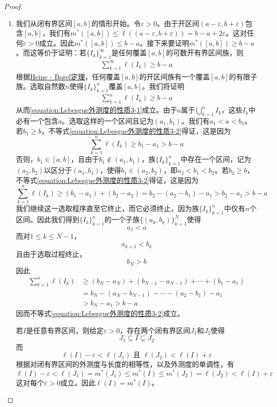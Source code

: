 \documentclass[lang=cn,newtx,10pt,scheme=chinese]{../Template/elegantbook}
\begin{document}
\begin{proof}
\begin{enumerate}[(1)]
  \item 我们从闭有界区间\([a, b]\)的情形开始。令\(\varepsilon>0\)。由于开区间\((a - \varepsilon, b+\varepsilon)\)包含\([a, b]\)，我们有\(m^*([a, b])\leqslant\ell((a - \varepsilon, b+\varepsilon))=b - a + 2\varepsilon\)。这对任何\(\varepsilon>0\)成立。因此\(m^*([a, b])\leqslant b - a\)。接下来要证明\(m^*([a, b])\geqslant b - a\)。而这等价于证明：若\(\{I_k\}_{k = 1}^{\infty}\)是任何覆盖\([a, b]\)的可数开有界区间族，则
  \begin{align}
    \sum_{k = 1}^{\infty}\ell(I_k)\geqslant b - a \label{equation:Lebesgue外测度的性质3-1}
  \end{align}
  根据\hyperref[theorem:Heine - Borel定理]{Heine - Borel定理}，任何覆盖\([a, b]\)的开区间族有一个覆盖\([a, b]\)的有限子族。选取自然数\(n\)使得\(\{I_k\}_{k = 1}^{n}\)覆盖\([a, b]\)。我们将证明
  \begin{align}
    \sum_{k = 1}^{n}\ell(I_k)\geqslant b - a \label{equation:Lebesgue外测度的性质3-2}
  \end{align}
  从而\eqref{equation:Lebesgue外测度的性质3-1}成立。由于\(a\)属于\(\bigcup_{k = 1}^{n}I_k\)，这些\(I_k\)中必有一个包含\(a\)。选取这样的一个区间且记为\((a_1, b_1)\)。我们有\(a_1 < a < b_1\)。若\(b_1\geqslant b\)，不等式\eqref{equation:Lebesgue外测度的性质3-2}得证，这是因为
  \[
  \sum_{k = 1}^{n}\ell(I_k)\geqslant b_1 - a_1>b - a
  \]
  否则，\(b_1\in[a, b]\)，且由于\(b_1\notin(a_1, b_1)\)，族\(\{I_k\}_{k = 1}^{n}\)中存在一个区间，记为\((a_2, b_2)\)以区分于\((a_1, b_1)\)，使得\(b_1\in(a_2, b_2)\)，即\(a_2 < b_1 < b_2\)。若\(b_2\geqslant b\)，不等式\eqref{equation:Lebesgue外测度的性质3-2}得证，这是因为
  \[
  \sum_{k = 1}^{n}\ell(I_k)\geqslant(b_1 - a_1)+(b_2 - a_2)=b_2-(a_2 - b_1)-a_1>b_2 - a_1>b - a
  \]
  我们继续这一选取程序直至它终止，而它必须终止，因为族\(\{I_k\}_{k = 1}^{n}\)中仅有\(n\)个区间。因此我们得到\(\{I_k\}_{k = 1}^{n}\)的一个子族\(\{(a_k, b_k)\}_{k = 1}^{N}\)使得
  \[
  a_1 < a
  \]
  而对\(1\leqslant k\leqslant N - 1\)，
  \[
  a_{k + 1} < b_k
  \]
  且由于选取过程终止，
  \[
  b_N>b
  \]
  因此
  \begin{align*}
  \sum_{k = 1}^{n}\ell(I_k)&\geqslant(b_N - a_N)+(b_{N - 1} - a_{N - 1})+\cdots+(b_1 - a_1)\\
  &=b_N-(a_N - b_{N - 1})-\cdots-(a_2 - b_1)-a_1\\
  &>b_N - a_1>b - a
  \end{align*}
  因而不等式\eqref{equation:Lebesgue外测度的性质3-2}成立。
  
  若\(I\)是任意有界区间，则给定\(\varepsilon>0\)，存在两个闭有界区间\(J_1\)和\(J_2\)使得
  \[
  J_1\subseteq I\subseteq J_2
  \]
  而
  \[
  \ell(I)-\varepsilon<\ell(J_1)\text{ 且 }\ell(J_2)<\ell(I)+\varepsilon
  \]
  根据对闭有界区间的外测度与长度的相等性，以及外测度的单调性，有
  \[
  \ell(I)-\varepsilon<\ell(J_1)=m^*(J_1)\leqslant m^*(I)\leqslant m^*(J_2)=\ell(J_2)<\ell(I)+\varepsilon
  \]
  这对每个\(\varepsilon>0\)成立。因此\(\ell(I)=m^*(I)\)。
  

\end{enumerate}
\end{proof}
\end{document}
